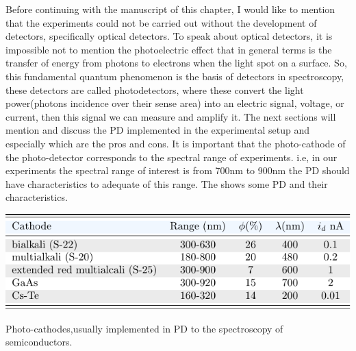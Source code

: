 Before continuing with the manuscript of this chapter, I would like to mention that the experiments could not be carried out without the development of detectors, specifically optical detectors. To speak about optical detectors, it is impossible not to mention the photoelectric effect that in general terms is the transfer of energy from photons to electrons when the light spot on a surface\cite{einstein1905uber}. So, this fundamental quantum phenomenon is the basis of detectors in spectroscopy, these detectors are called photodetectors, where these convert the light power(photons incidence over their sense area)  into an electric signal, voltage, or current, then this signal we can measure and amplify it. The next sections will mention and discuss the PD implemented in the experimental setup and especially which are the pros and cons. It is important that the photo-cathode of the photo-detector corresponds to the spectral range of experiments. i.e, in our experiments the spectral range of interest is from 700nm to 900nm the PD should have characteristics to adequate of this range. The  shows some PD and their characteristics\cite{tkachenko2006opticalspectroscopy}. 


\begin{table}[H]
	\centering
	\includegraphics[width=\textwidth]{../tables/table-photodetectors/out/photodetectors.pdf}
	\caption{Photo-cathodes,usually implemented in PD to the spectroscopy of semiconductors\cite{tkachenko2006opticalspectroscopy}. }
	\label{tab:chapter-3-section-samples-photodectors-materials}
\end{table}


